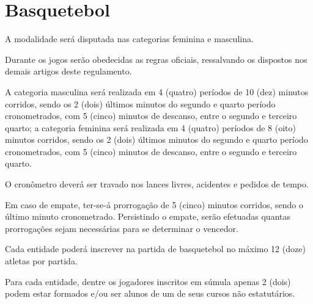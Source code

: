 {\let\clearpage\relax \chapter{Basquetebol}}

\begin{article}
	A modalidade será disputada nas categorias feminina e masculina.
\end{article}

\begin{article}
	Durante os jogos serão obedecidas as regras oficiais, ressalvando os dispostos nos demais artigos deste regulamento.
\end{article}

\begin{article}
	A categoria masculina será realizada em 4 (quatro) períodos de 10 (dez) minutos corridos, sendo os 2 (dois) últimos minutos do segundo e quarto período cronometrados, com 5 (cinco) minutos de descanso, entre o segundo e terceiro quarto; a categoria feminina será realizada em 4 (quatro) períodos de 8 (oito) minutos corridos, sendo os 2 (dois) últimos minutos do segundo e quarto período cronometrados, com 5 (cinco) minutos de descanso, entre o segundo e terceiro quarto.

	\begin{xparagraph}
		O cronômetro deverá ser travado nos lances livres, acidentes e pedidos de tempo.
	\end{xparagraph}

	\begin{xparagraph}
		Em caso de empate, ter-se-á prorrogação de 5 (cinco) minutos corridos, sendo o último minuto cronometrado. Persistindo o empate, serão efetuadas quantas prorrogações sejam necessárias para se determinar o vencedor.
	\end{xparagraph}
\end{article}

\begin{article}
	Cada entidade poderá inscrever na partida de basquetebol no máximo 12 (doze) atletas por partida.
\end{article}

\begin{article}
	Para cada entidade, dentre os jogadores inscritos em súmula apenas 2 (dois) podem estar formados e/ou ser alunos de um de seus cursos não estatutários.
\end{article}

